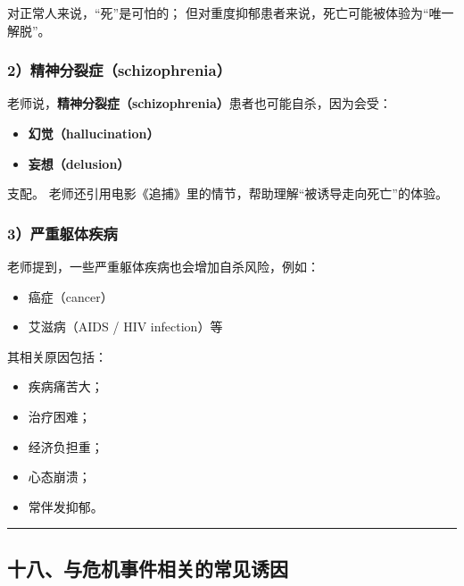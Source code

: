 \documentclass[
  chinese,
  9pt,
  a4paper,
]{ctexart}
\providecommand{\tightlist}{%
  \setlength{\itemsep}{0pt}\setlength{\parskip}{0pt}}
\begin{document}
对正常人来说，``死''是可怕的；
但对重度抑郁患者来说，死亡可能被体验为``唯一解脱''。

\subsubsection{2）精神分裂症（schizophrenia）}\label{ux7cbeux795eux5206ux88c2ux75c7schizophrenia}

老师说，\textbf{精神分裂症（schizophrenia）}患者也可能自杀，因为会受：

\begin{itemize}
\tightlist
\item
  \textbf{幻觉（hallucination）}
\item
  \textbf{妄想（delusion）}
\end{itemize}

支配。
老师还引用电影《追捕》里的情节，帮助理解``被诱导走向死亡''的体验。

\subsubsection{3）严重躯体疾病}\label{ux4e25ux91cdux8eafux4f53ux75beux75c5}

老师提到，一些严重躯体疾病也会增加自杀风险，例如：

\begin{itemize}
\tightlist
\item
  癌症（cancer）
\item
  艾滋病（AIDS / HIV infection）等
\end{itemize}

其相关原因包括：

\begin{itemize}
\tightlist
\item
  疾病痛苦大；
\item
  治疗困难；
\item
  经济负担重；
\item
  心态崩溃；
\item
  常伴发抑郁。
\end{itemize}

\begin{center}\rule{0.5\linewidth}{0.5pt}\end{center}

\subsection{十八、与危机事件相关的常见诱因}\label{ux5341ux516bux4e0eux5371ux673aux4e8bux4ef6ux76f8ux5173ux7684ux5e38ux89c1ux8bf1ux56e0}
\end{document}
